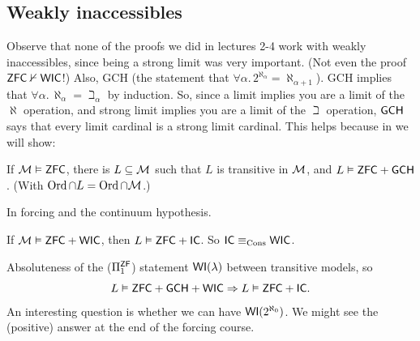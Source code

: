 \documentclass{article}
\begin{document}
\subsection{Weakly inaccessibles}
Observe that none of the proofs we did in lectures 2-4 work with weakly inaccessibles, since being a strong limit was very important. (Not even the proof $\mathsf{ZFC} \nvdash \mathsf{WIC}$!)\gap 
Also, GCH (the statement that $\forall \alpha. \, 2^{\aleph_{\alpha}}=\aleph_{\alpha+1}$). GCH implies that $\forall \alpha. \, \aleph_{\alpha} = \beth_{\alpha}$ by induction. So, since a limit implies you are a limit of the $\aleph$ operation, and strong limit implies you are a limit of the $\beth$ operation, $\mathsf{GCH}$ says that every limit cardinal is a strong limit cardinal. This helps because in  we will show: \begin{fancythm}[]
    If $\mathcal{M} \vDash \mathsf{ZFC}$, there is $L \subseteq \mathcal{M}$ such that $L$ is transitive in $\mathcal{M}$, and $L \vDash \mathsf{ZFC} + \mathsf{GCH}$. (With $\operatorname{Ord} \cap L = \operatorname{Ord} \cap \mathcal{M}$.)
\end{fancythm}
\proof In forcing and the continuum hypothesis. \endproof
\begin{corr}{}
    If $\mathcal{M} \vDash \mathsf{ZFC} + \mathsf{WIC}$, then $L \vDash \mathsf{ZFC} + \mathsf{IC}$. So $\mathsf{IC} \equiv_{\operatorname{Cons}} \mathsf{WIC}$.
\end{corr}
\proof Absoluteness of the ($\Pi_{1}^{\mathsf{ZF}}$) statement $\mathsf{WI}(\lambda)$ between transitive models, so \[ L \vDash \mathsf{ZFC} + \mathsf{GCH} + \mathsf{WIC} \Rightarrow L \vDash \mathsf{ZFC} + \mathsf{IC}.\] \endproof 
An interesting question is whether we can have $\mathsf{WI}(2^{\aleph_{0}})$. We might see the (positive) answer at the end of the forcing course.
\end{document}
